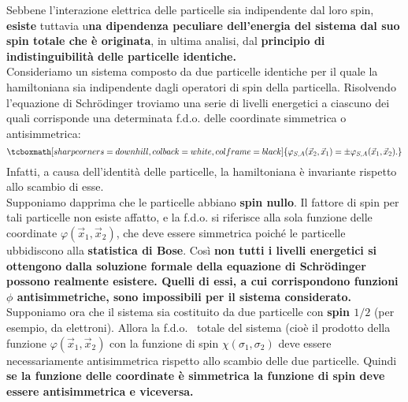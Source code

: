 Sebbene l'interazione elettrica delle particelle sia indipendente dal loro spin, \textbf{esiste} tuttavia u\textbf{na dipendenza peculiare dell'energia del sistema dal suo spin totale che è originata}, in ultima analisi, dal \textbf{principio di indistinguibilità delle particelle identiche.}\\

Consideriamo un sistema composto da due particelle identiche per il quale la hamiltoniana sia indipendente dagli operatori di spin della particella. Risolvendo l'equazione di Schr\"{o}dinger troviamo una serie di livelli energetici a ciascuno dei quali corrisponde una determinata f.d.o. delle coordinate simmetrica o antisimmetrica:
	\begin{equation}
		\tcboxmath[sharp corners=downhill, colback=white, colframe=black]{
			\varphi_{S,A}(\vec{x}_2,\vec{x}_1)= \pm \varphi_{S,A}(\vec{x}_1,\vec{x}_2) .
			}
	\end{equation}
Infatti, a causa dell'identità delle particelle, la hamiltoniana è invariante rispetto allo scambio di esse.\\

Supponiamo dapprima che le particelle abbiano \textbf{spin nullo}. Il fattore di spin per tali particelle non esiste affatto, e la f.d.o. si riferisce alla sola funzione delle coordinate $\varphi(\vec{x}_1, \vec{x}_2)$, che deve essere simmetrica poiché le particelle ubbidiscono alla \textbf{statistica di Bose}. Così \textbf{non tutti i livelli energetici si ottengono dalla soluzione formale della equazione di Schr\"{o}dinger possono realmente esistere. Quelli di essi, a cui corrispondono funzioni $\phi$ antisimmetriche, sono impossibili per il sistema considerato.}\\

Supponiamo ora che il sistema sia costituito da due particelle con \textbf{spin $1/2$} (per esempio, da elettroni). Allora la f.d.o.~ totale del sistema (cioè il prodotto della funzione $\varphi(\vec{x}_1,\vec{x}_2)$ con la funzione di spin $\chi(\sigma_1, \sigma_2)$ deve essere necessariamente antisimmetrica rispetto allo scambio delle due particelle. Quindi \textbf{se la funzione delle coordinate è simmetrica la funzione di spin deve essere antisimmetrica e viceversa.}\\

